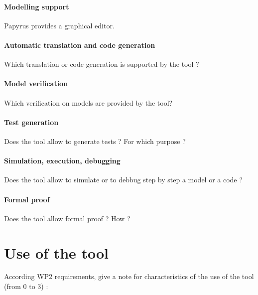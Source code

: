 \paragraph{Modelling support}
Papyrus provides a graphical editor.

\paragraph{Automatic translation and code generation}
Which translation or code generation is supported by the tool ?

\paragraph{Model verification}
Which verification on models are provided by the tool?

\paragraph{Test generation}
Does the tool allow to generate tests ? For which purpose ?

\paragraph{Simulation, execution, debugging}
Does the tool allow to simulate or to debbug step by step a model or a code ?

\paragraph{Formal proof}
Does the tool allow formal proof ? How ?

\section{Use of the tool}

According WP2 requirements, give a note for characteristics of the use of the tool (from 0 to 3) :


